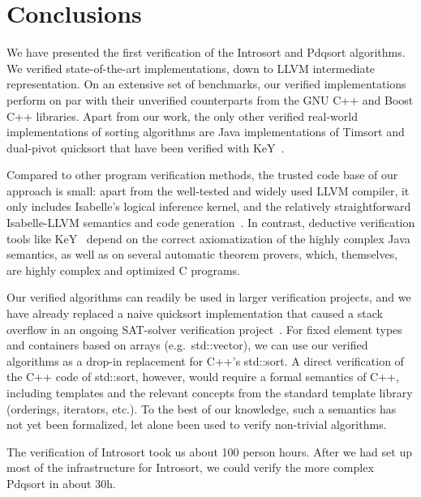 \documentclass[runningheads]{llncs}
\begin{document}
{\section{Conclusions}
We have presented the first verification of the Introsort and Pdqsort algorithms.
We verified state-of-the-art implementations, down to LLVM intermediate representation.
On an extensive set of benchmarks, our verified implementations perform on par with their
unverified counterparts from the GNU C++ and Boost C++ libraries.
Apart from our work, the only other verified real-world implementations of sorting algorithms
are Java implementations of Timsort and dual-pivot quicksort that have been verified with KeY~\cite{GRBBH15,BSSU17}.


Compared to other program verification methods, the trusted code base of our approach is small:
apart from the well-tested and widely used LLVM compiler, it only includes Isabelle's logical inference kernel, and the
relatively straightforward Isabelle-LLVM semantics and code generation~\cite{La19-llvm}.
In contrast, deductive verification tools like KeY~\cite{BHS07} depend on the correct axiomatization of the highly complex Java semantics,
as well as on several automatic theorem provers, which, themselves, are highly complex and optimized C programs.

Our verified algorithms can readily be used in
larger verification projects, and we have already replaced a naive quicksort implementation that caused a stack overflow in
an ongoing SAT-solver verification project~\cite{FBL18}.
For fixed element types and containers based on arrays (e.g.\ std::vector), we can use our verified algorithms as
a drop-in replacement for C++'s std::sort. A direct verification of the C++ code of std::sort, however,
would require a formal semantics of C++, including templates and the relevant concepts from the standard template library (orderings, iterators, etc.).
To the best of our knowledge, such a semantics has not yet been formalized, let alone been used to verify non-trivial algorithms.

The verification of Introsort took us about 100 person hours.
After we had set up most of the infrastructure for Introsort, we could verify the more
complex Pdqsort in about 30h.


}
\end{document}
